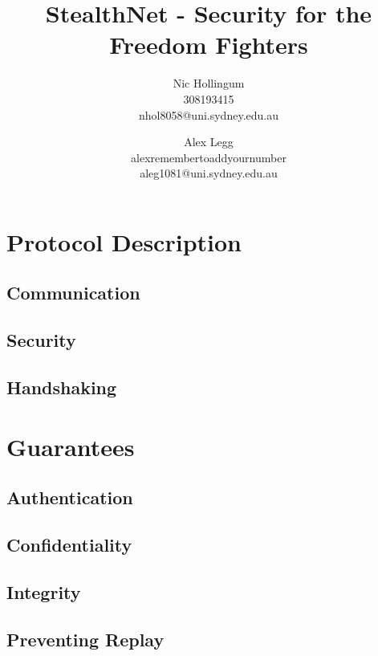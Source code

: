 
\author{
		Nic Hollingum\\
		308193415\\
		nhol8058@uni.sydney.edu.au
	\and
		Alex Legg\\
		alexremembertoaddyournumber\\
		aleg1081@uni.sydney.edu.au
}
\title{StealthNet - Security for the Freedom Fighters}

\addtolength{\oddsidemargin}{-.875in}
\addtolength{\evensidemargin}{-.875in}
\addtolength{\textwidth}{1.75in}
\addtolength{\topmargin}{-.875in}
\addtolength{\textheight}{1.75in}


\maketitle

\section {Protocol Description}
\subsection{Communication}

\subsection{Security}

\subsection{Handshaking}

\section {Guarantees}
\subsection{Authentication}
\subsection{Confidentiality}
\subsection{Integrity}
\subsection{Preventing Replay}


